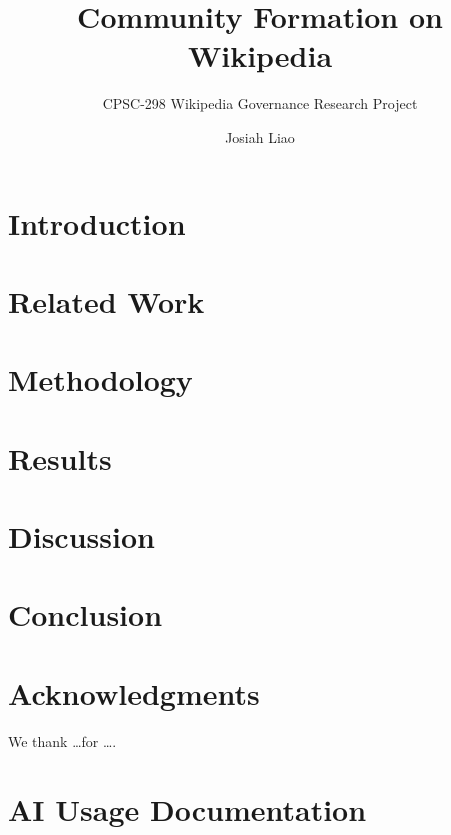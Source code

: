 \documentclass[sigconf,screen]{acmart}
\title{Community Formation on Wikipedia}
\subtitle{CPSC-298 Wikipedia Governance Research Project}
\author{Josiah Liao}
\affiliation{%
  \institution{Chapman University}
  \city{Orange, California}
  \country{USA}
}
\begin{document}
\maketitle

\section{Introduction}


\section{Related Work}


\section{Methodology}


\section{Results}


\section{Discussion}


\section{Conclusion}


\section*{Acknowledgments}
We thank \dots for \ldots.




\appendix
\section{AI Usage Documentation}

\end{document}
